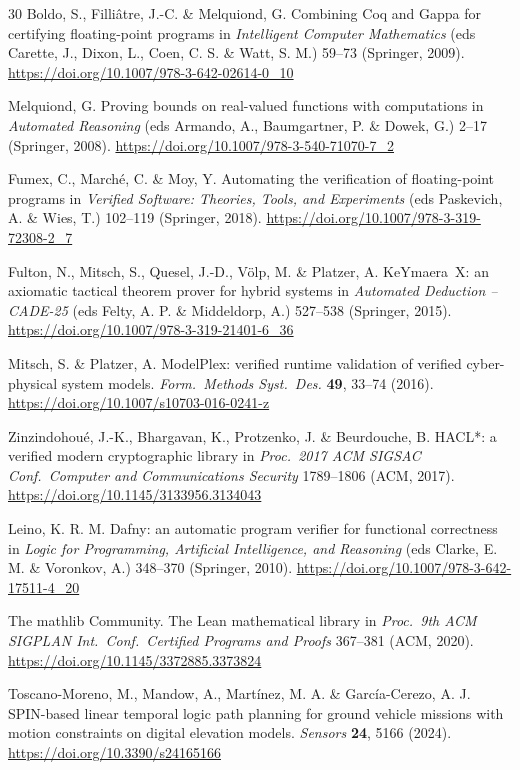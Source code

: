 \documentclass[11pt,a4paper]{article}
\begin{document}
\begin{thebibliography}{30}
Boldo, S., Filli\^atre, J.-C. \& Melquiond, G. Combining Coq and Gappa for certifying floating-point programs in
\textit{Intelligent Computer Mathematics} (eds Carette, J., Dixon, L., Coen, C. S. \& Watt, S. M.)
59--73 (Springer, 2009).
\url{https://doi.org/10.1007/978-3-642-02614-0_10}

Melquiond, G. Proving bounds on real-valued functions with computations in
\textit{Automated Reasoning} (eds Armando, A., Baumgartner, P. \& Dowek, G.)
2--17 (Springer, 2008).
\url{https://doi.org/10.1007/978-3-540-71070-7_2}

Fumex, C., March\'e, C. \& Moy, Y. Automating the verification of floating-point programs in
\textit{Verified Software: Theories, Tools, and Experiments}
(eds Paskevich, A. \& Wies, T.) 102--119 (Springer, 2018).
\url{https://doi.org/10.1007/978-3-319-72308-2_7}

Fulton, N., Mitsch, S., Quesel, J.-D., V\"olp, M. \& Platzer, A.
KeYmaera~X: an axiomatic tactical theorem prover for hybrid systems in
\textit{Automated Deduction -- CADE-25}
(eds Felty, A. P. \& Middeldorp, A.) 527--538 (Springer, 2015).
\url{https://doi.org/10.1007/978-3-319-21401-6_36}

Mitsch, S. \& Platzer, A. ModelPlex: verified runtime validation of verified cyber-physical system models.
\textit{Form.\ Methods Syst.\ Des.} \textbf{49}, 33--74 (2016).
\url{https://doi.org/10.1007/s10703-016-0241-z}

Zinzindohou\'e, J.-K., Bhargavan, K., Protzenko, J. \& Beurdouche, B.
HACL*: a verified modern cryptographic library in
\textit{Proc.\ 2017 ACM SIGSAC Conf.\ Computer and Communications Security}
1789--1806 (ACM, 2017).
\url{https://doi.org/10.1145/3133956.3134043}

Leino, K. R. M. Dafny: an automatic program verifier for functional correctness in
\textit{Logic for Programming, Artificial Intelligence, and Reasoning}
(eds Clarke, E. M. \& Voronkov, A.) 348--370 (Springer, 2010).
\url{https://doi.org/10.1007/978-3-642-17511-4_20}

The mathlib Community. The Lean mathematical library in
\textit{Proc.\ 9th ACM SIGPLAN Int.\ Conf.\ Certified Programs and Proofs}
367--381 (ACM, 2020).
\url{https://doi.org/10.1145/3372885.3373824}

Toscano-Moreno, M., Mandow, A., Mart\'inez, M. A. \& Garc\'ia-Cerezo, A. J.
SPIN-based linear temporal logic path planning for ground vehicle missions with motion constraints on digital elevation models.
\textit{Sensors} \textbf{24}, 5166 (2024).
\url{https://doi.org/10.3390/s24165166}


\end{thebibliography}
\end{document}
